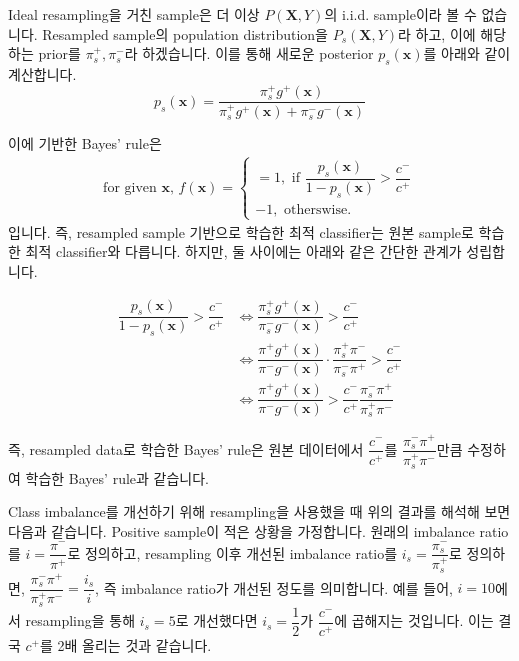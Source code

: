 \documentclass[11pt]{article}
\begin{document}
	Ideal resampling을 거친 sample은 더 이상 $P(\mathbf{X},Y)$의 i.i.d. sample이라 볼 수 없습니다. Resampled sample의  population distribution을 $P_s(\mathbf{X}, Y)$라 하고, 이에 해당하는 prior를 $\pi^+_s, \pi^-_s$라 하겠습니다. 이를 통해 새로운 posterior $p_s(\mathbf{x})$를 아래와 같이 계산합니다.
	$$p_s(\mathbf{x}) = 
	\dfrac{\pi_s^+ g^+(\mathbf{x})}{\pi_s^+ g^+(\mathbf{x}) + \pi_s^- g^-(\mathbf{x})}
	$$
	
	이에 기반한 Bayes' rule은
\begin{align*}
	\text{for given $\mathbf{x}$, } f(\mathbf{x})=
	\begin{cases}
		= 1, \text{ if }
		\dfrac{p_s(\mathbf{x}) }{1 - p_s(\mathbf{x}) } > \dfrac{c^-}{c^+}
		\\
		-1, \text{ otherswise}.
	\end{cases}
\end{align*}
	입니다. 즉, resampled sample 기반으로 학습한 최적 classifier는 원본 sample로 학습한 최적 classifier와 다릅니다. 하지만, 둘 사이에는 아래와 같은 간단한 관계가 성립합니다.

\begin{align*}
\dfrac{p_s(\mathbf{x}) }{1 - p_s(\mathbf{x}) } > \dfrac{c^-}{c^+}
&\iff
\dfrac{\pi_s^+ g^+(\mathbf{x}) }{\pi_s^- g^-(\mathbf{x}) } > \dfrac{c^-}{c^+}
\\&\iff
\dfrac{\pi^+ g^+(\mathbf{x}) }{\pi^- g^-(\mathbf{x}) }
\cdot
\dfrac{\pi_s^+ \pi^-}{\pi_s^- \pi^+} > \dfrac{c^-}{c^+}
\\&\iff
\dfrac{\pi^+ g^+(\mathbf{x}) }{\pi^- g^-(\mathbf{x}) }
> \dfrac{c^-}{c^+} \dfrac{\pi_s^- \pi^+} {\pi_s^+ \pi^-}
\end{align*}

즉, resampled data로 학습한 Bayes' rule은 원본 데이터에서 $\dfrac{c^-}{c^+}$를 $\dfrac{\pi_s^- \pi^+} {\pi_s^+ \pi^-}$만큼 수정하여 학습한 Bayes' rule과 같습니다.

Class imbalance를 개선하기 위해 resampling을 사용했을 때 위의 결과를 해석해 보면 다음과 같습니다. Positive sample이 적은 상황을 가정합니다. 원래의 imbalance ratio를 $i = \dfrac{\pi^-}{\pi^+}$로 정의하고, resampling 이후 개선된 imbalance ratio를 $i_s = \dfrac{\pi_s^-}{\pi_s^+}$로 정의하면, $\dfrac{\pi_s^- \pi^+} {\pi_s^+ \pi^-} = \dfrac{i_s}{i}$, 즉 imbalance ratio가 개선된 정도를 의미합니다. 예를 들어, $i = 10$에서 resampling을 통해 $i_s = 5$로 개선했다면 $i_s = \dfrac{1}{2}$가 $\dfrac{c^-}{c^+}$에 곱해지는 것입니다. 이는 결국 $c^+$를 2배 올리는 것과 같습니다.
\end{document}
